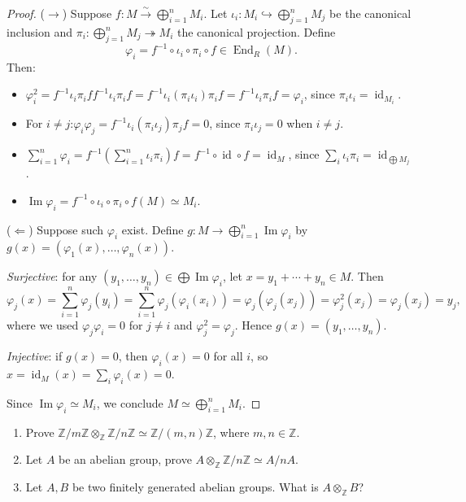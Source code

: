 \begin{proof}
    ($\to$) Suppose $f:M\xrightarrow{\sim}\bigoplus_{i=1}^n M_i$. Let $\iota_i:M_i\hookrightarrow \bigoplus_{j=1}^n M_j$ be the canonical inclusion and $\pi_i:\bigoplus_{j=1}^n M_j\twoheadrightarrow M_i$ the canonical projection. Define
    \[
        \varphi_i = f^{-1}\circ\iota_i\circ\pi_i\circ f \in \operatorname{End}_R(M).
    \]
    Then:
    \begin{itemize}
        \item $\varphi_i^2 = f^{-1}\iota_i\pi_i f f^{-1}\iota_i\pi_i f = f^{-1}\iota_i(\pi_i\iota_i)\pi_i f = f^{-1}\iota_i\pi_i f = \varphi_i$, since $\pi_i\iota_i=\operatorname{id}_{M_i}$.
        \item For $i\neq j$:$\varphi_i\varphi_j = f^{-1}\iota_i(\pi_i\iota_j)\pi_j f = 0$, since $\pi_i\iota_j=0$ when $i\neq j$.
        \item $\sum_{i=1}^n \varphi_i = f^{-1}\left(\sum_{i=1}^n \iota_i\pi_i\right) f = f^{-1}\circ\operatorname{id}\circ f = \operatorname{id}_M$, since $\sum_i \iota_i\pi_i = \operatorname{id}_{\bigoplus M_j}$.
        \item $\operatorname{Im}\varphi_i = f^{-1}\circ\iota_i\circ\pi_i\circ f(M) \simeq M_i$.
    \end{itemize}

    ($\Leftarrow$) Suppose such $\varphi_i$ exist. Define $g:M\to \bigoplus_{i=1}^n \operatorname{Im}\varphi_i$ by $g(x)=(\varphi_1(x),\ldots,\varphi_n(x))$.

    \textit{Surjective}: for any $(y_1,\ldots,y_n)\in\bigoplus \operatorname{Im}\varphi_i$, let $x = y_1+\cdots+y_n \in M$. Then
    \[
        \varphi_j(x) = \sum_{i=1}^n \varphi_j(y_i) = \sum_{i=1}^n \varphi_j(\varphi_i(x_i)) = \varphi_j(\varphi_j(x_j)) = \varphi_j^2(x_j) = \varphi_j(x_j) = y_j,
    \]
    where we used $\varphi_j\varphi_i=0$ for $j\neq i$ and $\varphi_j^2=\varphi_j$. Hence $g(x)=(y_1,\ldots,y_n)$.

    \textit{Injective}: if $g(x)=0$, then $\varphi_i(x)=0$ for all $i$, so $x=\operatorname{id}_M(x)=\sum_i\varphi_i(x)=0$.

    Since $\operatorname{Im}\varphi_i\simeq M_i$, we conclude $M\simeq\bigoplus_{i=1}^n M_i$.
\end{proof}

\begin{exercise}\leavevmode
    \begin{enumerate}
        \item Prove $\mathbb{Z}/m\mathbb{Z} \otimes_{\mathbb{Z}} \mathbb{Z}/n\mathbb{Z} \simeq \mathbb{Z}/(m,n)\mathbb{Z}$, where $m, n \in \mathbb{Z}$.
        \item Let $A$ be an abelian group, prove $A \otimes_{\mathbb{Z}} \mathbb{Z}/n\mathbb{Z} \simeq A/nA$.
        \item Let $A, B$ be two finitely generated abelian groups. What is $A \otimes_{\mathbb{Z}} B$?
    \end{enumerate}
\end{exercise}

